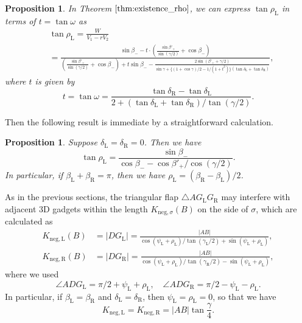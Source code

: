 \documentclass[11pt]{amsart}
\newtheorem{proposition}[theorem]{Proposition}
\numberwithin{equation}{section}
\numberwithin{theorem}{section}
\newcommand{\Lt}{\ensuremath{\mathrm{L}}}
\newcommand{\Rt}{\ensuremath{\mathrm{R}}}
\newcommand{\norm}[1]{\ensuremath{\left| #1 \right|}}
\newcommand{\nega}{\ensuremath{\mathrm{neg}}}
\begin{document}
\begin{proposition}
In Theorem $\ref{thm:existence_rho}$, we can express $\tan\rho_\Lt$ in terms of $t=\tan\omega$ as
\begin{align*}
&\tan\rho_\Lt =\frac{W}{V_1-rV_2}\\
&=\frac{\displaystyle\sin\beta_--t\cdot\left(\frac{\sin\beta'_+}{\sin (\gamma /2)}+\cos\beta_-\right)}
{\displaystyle\left(\frac{\sin\beta'_+}{\sin (\gamma /2)}+\cos\beta_-\right)+t\sin\beta_-
-\frac{2\sin (\beta'_++\gamma /2)}{\sin\gamma +\{(1+\cos\gamma )/2-1/(1+t^2)\} (\tan\delta_\Lt +\tan\delta_\Rt )}},
\end{align*}
where $t$ is given by
\begin{equation*}
t=\tan\omega =\frac{\tan\delta_\Rt -\tan\delta_\Lt}{2+(\tan\delta_\Lt +\tan\delta_\Rt )/\tan (\gamma /2)}.
\end{equation*}
\end{proposition}
Then the following result is immediate by a straightforward calculation.
\begin{proposition}\label{prop:rho_alt}
Suppose $\delta_\Lt =\delta_\Rt =0$.
Then we have
\begin{equation*}
\tan\rho_\Lt =\frac{\sin\beta_-}{\cos\beta_--\cos\beta'_+/\cos (\gamma /2)}.
\end{equation*}
In particular, if $\beta_\Lt +\beta_\Rt =\pi$, then we have $\rho_\Lt =(\beta_\Rt -\beta_\Lt )/2$.
\end{proposition}
As in the previous sections, the triangular flap $\triangle AG_\Lt G_\Rt$ may interfere with adjacent $3$D gadgets within the length
$K_{\nega ,\sigma}(B)$ on the side of $\sigma$, which are calculated as
\begin{equation}\label{eq:interference_negative_3}
\begin{aligned}
K_{\nega ,\Lt}(B)&=\norm{DG_\Lt}=\frac{\norm{AB}}{\cos (\psi_\Lt +\rho_\Lt )/\tan (\gamma_\Lt /2)+\sin (\psi_\Lt +\rho_\Lt )},\\
K_{\nega ,\Rt}(B)&=\norm{DG_\Rt}=\frac{\norm{AB}}{\cos (\psi_\Lt +\rho_\Lt )/\tan (\gamma_\Rt /2)-\sin (\psi_\Lt +\rho_\Lt )},
\end{aligned}
\end{equation}
where we used 
\begin{equation*}
\angle ADG_\Lt =\pi /2+\psi_\Lt +\rho_\Lt ,\quad\angle ADG_\Rt =\pi /2-\psi_\Lt -\rho_\Lt .
\end{equation*}
In particular, if $\beta_\Lt =\beta_\Rt$ and $\delta_\Lt =\delta_\Rt$, then $\psi_\Lt =\rho_\Lt =0$, so that we have
\begin{equation*}
K_{\nega ,\Lt}=K_{\nega ,\Rt}=\norm{AB}\tan\frac{\gamma}{4}.
\end{equation*}
\end{document}
